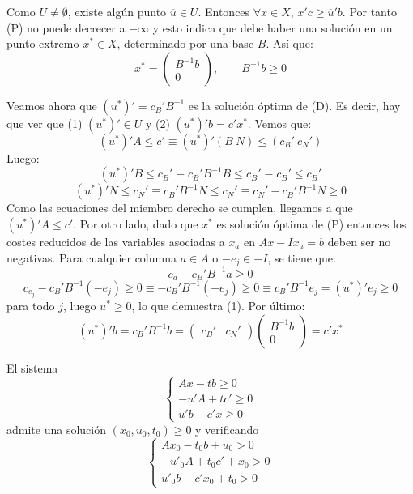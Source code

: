 \documentclass[PM.tex]{subfiles}
\begin{document}
\begin{dem}
Como $U \neq \emptyset$, existe algún punto $\overline{u} \in U$. Entonces $\forall x \in X$, $x'c ≥ \overline{u}'b$. Por tanto (P) no puede decrecer a $-\infty$ y esto indica que debe haber una solución en un punto extremo $x^* \in X$, determinado por una base $B$. Así que:
\[ x^* = \begin{pmatrix}B^{-1} b \\ 0\end{pmatrix}, \qquad B^{-1}b ≥ 0 \]

Veamos ahora que $(u^*)' = c_B'B^{-1}$ es la solución óptima de (D). Es decir, hay que ver que (1) $(u^*)' \in U$ y (2) $(u^*)'b = c'x^*$. Vemos que:
\[ (u^*)'A ≤ c' \equiv (u^*)' (B \ N) ≤ (c_B' \ c_N') \]
Luego:
\[ (u^*)'B ≤ c_B' \equiv c_B'B^{-1}B ≤ c_B' \equiv c_B' ≤ c_B'\]
\[ (u^*)'N ≤ c_N' \equiv c_B'B^{-1}N ≤ c_N' \equiv c_N' - c_B'B^{-1}N ≥ 0\]
Como las ecuaciones del miembro derecho se cumplen, llegamos a que $(u^*)'A ≤ c'$. Por otro lado, dado que $x^*$ es solución óptima de (P) entonces los costes reducidos de las variables asociadas a $x_a$ en $Ax - I x_a = b$ deben ser no negativas. Para cualquier columna $a \in A$ o $-e_j \in -I$, se tiene que:
\[ c_a - c_B' B^{-1} a ≥ 0 \]
\[ c_{e_j} - c_B' B^{-1}(-e_j) ≥ 0 \equiv  -c_B'B^{-1}(-e_j) ≥ 0 \equiv c_B'B^{-1}e_j = (u^*)'e_j ≥ 0 \]
para todo $j$, luego $u^* ≥ 0$, lo que demuestra (1). Por último:
\[ (u^*)'b = c_B'B^{-1}b = \begin{pmatrix}c_B' & c_N'\end{pmatrix}\begin{pmatrix}B^{-1}b\\0\end{pmatrix} = c'x^* \]
\end{dem}

\begin{lema}
El sistema
\begin{equation*}\label{sistema1}\begin{cases}
	Ax - tb ≥ 0\\
	-u'A + tc' ≥ 0\\
	u'b - c'x ≥ 0
\end{cases}\end{equation*}
admite una solución $(x_0,u_0,t_0) ≥ 0$ y verificando
\begin{equation*}\label{sistema2}\begin{cases}
	Ax_0 - t_0b +u_0     > 0\\
	-u'_0A + t_0c' + x_0  > 0\\
	u'_0b - c'x_0 + t_0 > 0
\end{cases}\end{equation*}
\end{lema}
\end{document}
